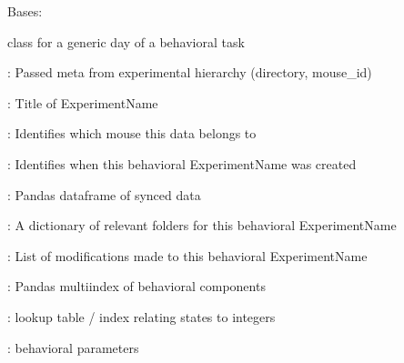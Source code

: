 \documentclass[letterpaper,10pt,english]{sphinxmanual}
\begin{document}
\begin{fulllineitems}
\label{\detokenize{Organization:Organization.BehavioralExperiment}}
\pysigstartsignatures
{}
\pysigstopsignatures
\sphinxAtStartPar
Bases: {\hyperref[\detokenize{Organization:Organization.Experiment}]{}}

\sphinxAtStartPar
{} class for a generic day of a behavioral task
\begin{description}
\begin{DUlineblock}{0em}
\item[]  : Passed meta from experimental hierarchy (directory, mouse\_id)
\item[]  : Title of ExperimentName
\end{DUlineblock}

\begin{DUlineblock}{0em}
\item[]  : Identifies which mouse this data belongs to
\item[]  : Identifies when this behavioral ExperimentName was created
\end{DUlineblock}

\begin{DUlineblock}{0em}
\item[]  : Pandas dataframe of synced data
\item[]  : A dictionary of relevant folders for this behavioral ExperimentName
\item[]  : List of modifications made to this behavioral ExperimentName
\item[] : Pandas multi\sphinxhyphen{}index of behavioral components
\item[]  : look\sphinxhyphen{}up table / index relating states to integers
\item[]  : behavioral parameters
\end{DUlineblock}


\end{description}
\end{fulllineitems}
\end{document}
